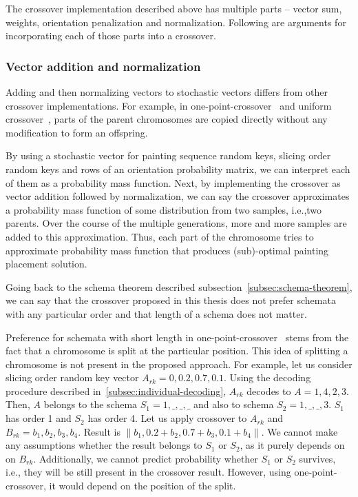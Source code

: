 The crossover implementation described above has multiple parts – vector sum, weights, orientation penalization and normalization.
Following are arguments for incorporating each of those parts into a crossover.

\subsubsection*{Vector addition and normalization}

Adding and then normalizing vectors to stochastic vectors differs from other crossover implementations.
For example, in one-point-crossover~\cite{hollandAdaptationNaturalArtificial1975} and
uniform crossover~\cite{uniformCrossover1989}, parts of the parent chromosomes are copied directly without any modification to form an offspring.

By using a stochastic vector for painting sequence random keys, slicing order random keys and rows of an orientation probability matrix,
we can interpret each of them as a probability mass function.
Next, by implementing the crossover as vector addition followed by normalization, we can
say the crossover approximates a probability mass function of some distribution from two samples, i.e.,two parents.
Over the course of the multiple generations, more and more samples are added to this approximation.
Thus, each part of the chromosome tries to approximate probability mass function
that produces (sub)-optimal painting placement solution.

Going back to the schema theorem described subsection~\ref{subsec:schema-theorem},
we can say that the crossover proposed in this thesis does not prefer schemata with any particular order
and that length of a schema does not matter.

Preference for schemata with short length in one-point-crossover~\cite{hollandAdaptationNaturalArtificial1975}
stems from the fact that a chromosome is split at the particular position.
This idea of splitting a chromosome is not present in the proposed approach.
For example, let us consider slicing order random key vector $A_{rk} = 0, 0.2, 0.7, 0.1$.
Using the decoding procedure described in~\ref{subsec:individual-decoding},
$A_{rk}$ decodes to $A = 1, 4, 2, 3$.
Then, $A$ belongs to the schema $S_1 = 1, \_, \_, \_$ and also to schema $S_2 = 1, \_, \_, 3$.
$S_1$ has order 1 and $S_2$ has order 4.
Let us apply crossover to $A_{rk}$ and $B_{rk} = b_1, b_2, b_3, b_4$.
Result is $\|b_1, 0.2+b_2, 0.7+b_3, 0.1+b_4\|$.
We cannot make any assumptions whether the result belongs to $S_1$ or $S_2$, as it purely depends on on $B_{rk}$.
Additionally, we cannot predict probability whether $S_1$ or $S_2$ survives, i.e., they will be still present in the crossover result.
However, using one-point-crossover, it would depend on the position of the split.

